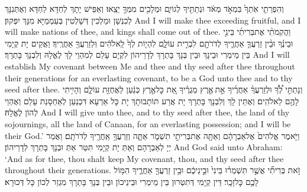 {וְהִפְרֵתִ֤י אֹֽתְךָ֙ בִּמְאֹ֣ד מְאֹ֔ד וּנְתַתִּ֖יךָ לְגוֹיִ֑ם וּמְלָכִ֖ים מִמְּךָ֥ יֵצֵֽאוּ׃}
{וְאַפֵּישׁ יָתָךְ לַחְדָּא לַחְדָּא וְאֶתְּנִנָּךְ לְכִנְשָׁן וּמַלְכִין דְּשָׁלְטִין בְּעַמְמַיָּא מִנָּךְ יִפְּקוּן׃}
{And I will make thee exceeding fruitful, and I will make nations of thee, and kings shall come out of thee.}{}
{וַהֲקִמֹתִ֨י אֶת\maqqaf בְּרִיתִ֜י בֵּינִ֣י וּבֵינֶ֗ךָ וּבֵ֨ין זַרְעֲךָ֧ אַחֲרֶ֛יךָ לְדֹרֹתָ֖ם לִבְרִ֣ית עוֹלָ֑ם לִהְי֤וֹת לְךָ֙ לֵֽאלֹהִ֔ים וּֽלְזַרְעֲךָ֖ אַחֲרֶֽיךָ׃}
{וַאֲקֵים יָת קְיָמִי בֵּין מֵימְרִי וּבֵינָךְ וּבֵין בְּנָךְ בָּתְרָךְ לְדָרֵיהוֹן לִקְיָם עָלַם לְמִהְוֵי לָךְ לֶאֱלָהּ וְלִבְנָךְ בָּתְרָךְ׃}
{And I will establish My covenant between Me and thee and thy seed after thee throughout their generations for an everlasting covenant, to be a God unto thee and to thy seed after thee.}{}
{וְנָתַתִּ֣י לְ֠ךָ֠ וּלְזַרְעֲךָ֨ אַחֲרֶ֜יךָ אֵ֣ת \legarmeh  אֶ֣רֶץ מְגֻרֶ֗יךָ אֵ֚ת כׇּל\maqqaf אֶ֣רֶץ כְּנַ֔עַן לַאֲחֻזַּ֖ת עוֹלָ֑ם וְהָיִ֥יתִי לָהֶ֖ם לֵאלֹהִֽים׃}
{וְאֶתֵּין לָךְ וְלִבְנָךְ בָּתְרָךְ יָת אֲרַע תּוֹתָבוּתָךְ יָת כָּל אַרְעָא דִּכְנַעַן לְאַחְסָנַת עָלַם וְאֶהְוֵי לְהוֹן לֶאֱלָהּ׃}
{And I will give unto thee, and to thy seed after thee, the land of thy sojournings, all the land of Canaan, for an everlasting possession; and I will be their God.’}{}
{וַיֹּ֤אמֶר אֱלֹהִים֙ אֶל\maqqaf אַבְרָהָ֔ם וְאַתָּ֖ה אֶת\maqqaf בְּרִיתִ֣י תִשְׁמֹ֑ר אַתָּ֛ה וְזַרְעֲךָ֥ אַֽחֲרֶ֖יךָ לְדֹרֹתָֽם׃}
{וַאֲמַר יְיָ לְאַבְרָהָם וְאַתְּ יָת קְיָמִי תִּטַּר אַתְּ וּבְנָךְ בָּתְרָךְ לְדָרֵיהוֹן׃}
{And God said unto Abraham: ‘And as for thee, thou shalt keep My covenant, thou, and thy seed after thee throughout their generations.}{}
{זֹ֣את בְּרִיתִ֞י אֲשֶׁ֣ר תִּשְׁמְר֗וּ בֵּינִי֙ וּבֵ֣ינֵיכֶ֔ם וּבֵ֥ין זַרְעֲךָ֖ אַחֲרֶ֑יךָ הִמּ֥וֹל לָכֶ֖ם כׇּל\maqqaf זָכָֽר׃}
{דֵּין קְיָמִי דְּתִטְּרוּן בֵּין מֵימְרִי וּבֵינֵיכוֹן וּבֵין בְּנָךְ בָּתְרָךְ מִגְזַר לְכוֹן כָּל דְּכוּרָא׃}
